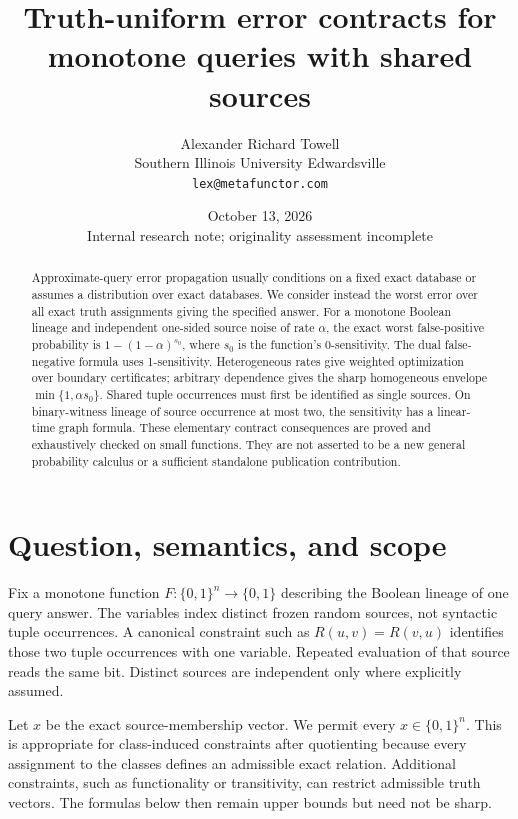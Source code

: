 \documentclass[11pt]{article}
\title{Truth-uniform error contracts for monotone queries with shared sources}
\author{Alexander Richard Towell\\Southern Illinois University Edwardsville\\
\texttt{lex@metafunctor.com}}
\date{October 13, 2026\\\small Internal research note; originality assessment incomplete}
\begin{document}
\maketitle
\begin{abstract}
Approximate-query error propagation usually conditions on a fixed exact
database or assumes a distribution over exact databases. We consider instead
the worst error over all exact truth assignments giving the specified answer.
For a monotone Boolean lineage and independent one-sided source noise of rate
$\alpha$, the exact worst false-positive probability is
$1-(1-\alpha)^{s_0}$, where $s_0$ is the function's 0-sensitivity. The dual
false-negative formula uses 1-sensitivity. Heterogeneous rates give weighted
optimization over boundary certificates; arbitrary dependence gives the sharp
homogeneous envelope $\min\{1,\alpha s_0\}$. Shared tuple occurrences must first
be identified as single sources. On binary-witness lineage of source occurrence
at most two, the sensitivity has a linear-time graph formula. These elementary
contract consequences are proved and exhaustively checked on small functions.
They are not asserted to be a new general probability calculus or a sufficient
standalone publication contribution.
\end{abstract}

\section{Question, semantics, and scope}

Fix a monotone function $F:\{0,1\}^n\to\{0,1\}$ describing the Boolean
lineage of one query answer. The variables index distinct frozen random
sources, not syntactic tuple occurrences. A canonical constraint such as
$R(u,v)=R(v,u)$ identifies those two tuple occurrences with one variable.
Repeated evaluation of that source reads the same bit. Distinct sources are
independent only where explicitly assumed.

Let $x$ be the exact source-membership vector. We permit every $x\in\{0,1\}^n$.
This is appropriate for class-induced constraints after quotienting because
every assignment to the classes defines an admissible exact relation. Additional
constraints, such as functionality or transitivity, can restrict admissible
truth vectors. The formulas below then remain upper bounds but need not be sharp.
\end{document}
